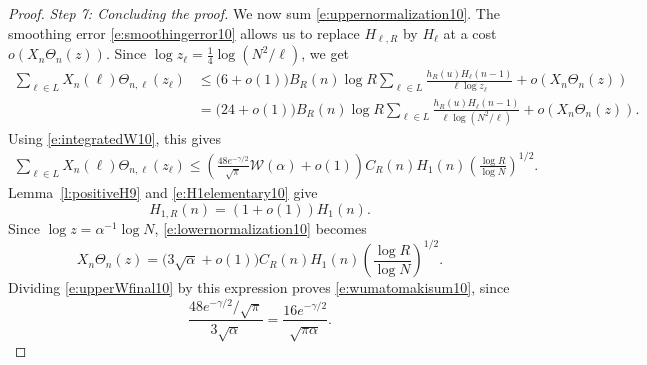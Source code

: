 \documentclass[12pt,reqno]{amsart}
\numberwithin{equation}{section}
\theoremstyle{definition}
\theoremstyle{remark}
\begin{document}
\begin{proof}
\emph{Step 7: Concluding the proof.}
We now sum \eqref{e:uppernormalization10}.  The smoothing error
\eqref{e:smoothingerror10} allows us to replace \(H_{\ell,R}\) by
\(H_\ell\) at a cost \(o(X_n\Theta_n(z))\).  Since
\(\log z_\ell=\frac14\log(N^2/\ell)\), we get
\begin{align*}
 \sum_{\ell\in L}X_n(\ell)\Theta_{n,\ell}(z_\ell)
 &\leq
 \bigl(6+o(1)\bigr)
 B_R(n)\log R
 \sum_{\ell\in L}
 \frac{h_R(u)H_\ell(n-1)}{\ell\log z_\ell}
 +o(X_n\Theta_n(z))\\
 &=
 \bigl(24+o(1)\bigr)
 B_R(n)\log R
 \sum_{\ell\in L}
 \frac{h_R(u)H_\ell(n-1)}
 {\ell\log(N^2/\ell)}
 +o(X_n\Theta_n(z)).
\end{align*}
Using \eqref{e:integratedW10}, this gives
\begin{align}\label{e:upperWfinal10}
 \sum_{\ell\in L}X_n(\ell)\Theta_{n,\ell}(z_\ell)
 \leq
 \left(\frac{48e^{-\gamma/2}}{\sqrt\pi}
 \mathcal W(\alpha)+o(1)\right)
 C_R(n)H_1(n)
 \left(\frac{\log R}{\log N}\right)^{1/2}.
\end{align}
Lemma~\ref{l:positiveH9} and \eqref{e:H1elementary10} give
\[
 H_{1,R}(n)=(1+o(1))H_1(n).
\]
Since \(\log z=\alpha^{-1}\log N\),
\eqref{e:lowernormalization10} becomes
\[
 X_n\Theta_n(z)
 =
 \bigl(3\sqrt\alpha+o(1)\bigr)
 C_R(n)H_1(n)
 \left(\frac{\log R}{\log N}\right)^{1/2}.
\]
Dividing \eqref{e:upperWfinal10} by this expression proves
\eqref{e:wumatomakisum10}, since
\[
 \frac{48e^{-\gamma/2}/\sqrt\pi}{3\sqrt\alpha}
 =
 \frac{16e^{-\gamma/2}}{\sqrt{\pi\alpha}}.
\]
\end{proof}
\end{document}
